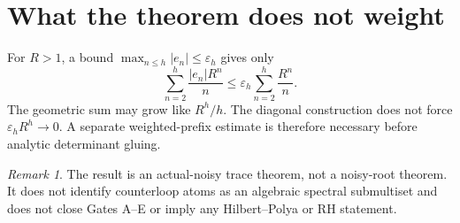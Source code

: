 \documentclass[11pt]{article}
\theoremstyle{remark}\newtheorem{remark}[theorem]{Remark}
\begin{document}
\section{What the theorem does not weight}
For $R>1$, a bound
$\max_{n\le h}|e_n|\le\varepsilon_h$ gives only
\[
 \sum_{n=2}^{h}\frac{|e_n|R^n}{n}
 \le\varepsilon_h\sum_{n=2}^{h}\frac{R^n}{n}.
\]
The geometric sum may grow like $R^h/h$.  The diagonal construction does not
force $\varepsilon_hR^h\to0$.  A separate weighted-prefix estimate is
therefore necessary before analytic determinant gluing.

\begin{remark}
The result is an actual-noisy trace theorem, not a noisy-root theorem.  It
does not identify counterloop atoms as an algebraic spectral submultiset and
does not close Gates A--E or imply any Hilbert--Polya or RH statement.
\end{remark}
\end{document}
